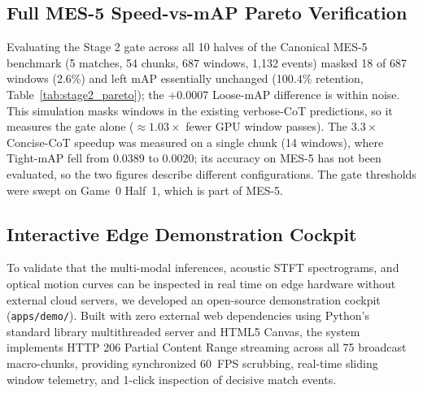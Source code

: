 \documentclass[10pt,twocolumn,letterpaper]{article}
\begin{document}
\subsection{Full MES-5 Speed-vs-mAP Pareto Verification}
Evaluating the Stage 2 gate across all 10 halves of the Canonical MES-5 benchmark (5 matches, 54 chunks, 687 windows, 1,132 events) masked 18 of 687 windows (2.6\%) and left mAP essentially unchanged (100.4\% retention, Table~\ref{tab:stage2_pareto}); the +0.0007 Loose-mAP difference is within noise. This simulation masks windows in the existing verbose-CoT predictions, so it measures the gate alone ($\approx 1.03\times$ fewer GPU window passes). The $3.3\times$ Concise-CoT speedup was measured on a single chunk (14 windows), where Tight-mAP fell from 0.0389 to 0.0020; its accuracy on MES-5 has not been evaluated, so the two figures describe different configurations. The gate thresholds were swept on Game~0 Half~1, which is part of MES-5.

\begin{table}[ht]
\centering
\caption{Canonical MES-5 Speed-vs-mAP Pareto Verification across 5 Matches (1,132 Ground-Truth Events, 17 Classes).}
\label{tab:stage2_pareto}
\small
{}
\end{table}

\subsection{Interactive Edge Demonstration Cockpit}
To validate that the multi-modal inferences, acoustic STFT spectrograms, and optical motion curves can be inspected in real time on edge hardware without external cloud servers, we developed an open-source demonstration cockpit (\texttt{apps/demo/}). Built with zero external web dependencies using Python's standard library multithreaded server and HTML5 Canvas, the system implements HTTP 206 Partial Content Range streaming across all 75 broadcast macro-chunks, providing synchronized 60~FPS scrubbing, real-time sliding window telemetry, and 1-click inspection of decisive match events.
\end{document}
